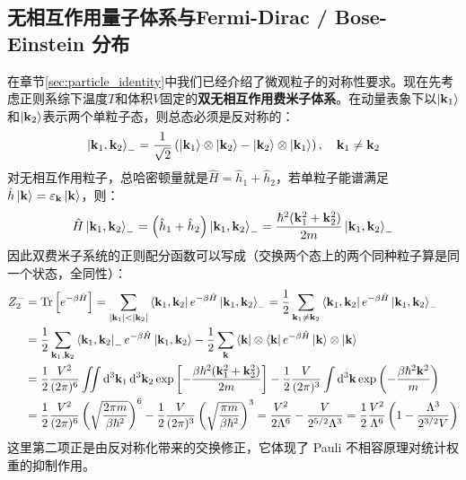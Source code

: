 \subsection{无相互作用量子体系与Fermi-Dirac / Bose-Einstein 分布}\label{sec:f_and_b}
在章节\ref{sec:particle_identity}中我们已经介绍了微观粒子的对称性要求。现在先考虑正则系综下温度$T$和体积$V$固定的\textbf{双无相互作用费米子体系}。在动量表象下以$\ket{\mathbf{k}_1}$和$\ket{\mathbf{k}_2}$表示两个单粒子态，则总态必须是反对称的：
\[\ket{\mathbf{k}_1,\mathbf{k}_2}_-=\frac{1}{\sqrt{2}}\left(\ket{\mathbf{k}_1}\otimes\ket{\mathbf{k}_2}-\ket{\mathbf{k}_2}\otimes\ket{\mathbf{k}_1}\right),\quad \mathbf{k}_1\neq \mathbf{k}_2\]
对无相互作用粒子，总哈密顿量就是$\hat{H}=\hat{h}_1+\hat{h}_2$，若单粒子能谱满足$\hat{h}\ket{\mathbf{k}}=\varepsilon_{\mathbf{k}}\ket{\mathbf{k}}$，则：
\[
\hat{H}\ket{\mathbf{k}_1,\mathbf{k}_2}_-=\left(\hat{h}_1+\hat{h}_2\right)\ket{\mathbf{k}_1,\mathbf{k}_2}_-
=\frac{\hbar^2(\mathbf{k}_1^2+\mathbf{k}_2^2)}{2m}\ket{\mathbf{k}_1,\mathbf{k}_2}_-
\]
因此双费米子系统的正则配分函数可以写成（交换两个态上的两个同种粒子算是同一个状态，全同性）：
\[\begin{aligned}
Z_2^-&=\Tr\left[e^{-\beta\hat{H}}\right]=\sum_{|\mathbf{k}_1|<|\mathbf{k}_2|}\bra{\mathbf{k}_1,\mathbf{k}_2} e^{-\beta\hat{H}}\ket{\mathbf{k}_1,\mathbf{k}_2}_-=\frac{1}{2}\sum_{\mathbf{k}_1\neq \mathbf{k}_2}\bra{\mathbf{k}_1,\mathbf{k}_2} e^{-\beta\hat{H}}\ket{\mathbf{k}_1,\mathbf{k}_2}_-\\
&=\frac{1}{2}\sum_{\mathbf{k}_1,\mathbf{k}_2}\bra{\mathbf{k}_1,\mathbf{k}_2}_- e^{-\beta\hat{H}}\ket{\mathbf{k}_1,\mathbf{k}_2}-\frac{1}{2}\sum_{\mathbf{k}}\bra{\mathbf{k}}\otimes\bra{\mathbf{k}}e^{-\beta\hat{H}}\ket{\mathbf{k}}\otimes\ket{\mathbf{k}}\\
&=\frac{1}{2}\frac{V^2}{(2\pi)^6}\iint \dd[3]{\mathbf{k}_1}\dd[3]{\mathbf{k}_2}\exp\left[-\frac{\beta\hbar^2(\mathbf{k}_1^2+\mathbf{k}_2^2)}{2m}\right]-\frac{1}{2}\frac{V}{(2\pi)^3}\int \dd[3]{\mathbf{k}}\exp\left(-\frac{\beta\hbar^2\mathbf{k}^2}{m}\right)\\
&=\frac{1}{2}\frac{V^2}{(2\pi)^6}\left(\sqrt{\frac{2\pi m}{\beta\hbar^2}}\right)^6-\frac{1}{2}\frac{V}{(2\pi)^3}\left(\sqrt{\frac{\pi m}{\beta\hbar^2}}\right)^3=\frac{V^2}{2\Lambda^6}-\frac{V}{2^{5/2}\Lambda^3}=\frac{1}{2}\frac{V^2}{\Lambda^6}\left(1-\frac{\Lambda^3}{2^{3/2}V}\right)
\end{aligned}\]
这里第二项正是由反对称化带来的交换修正，它体现了 Pauli 不相容原理对统计权重的抑制作用。

